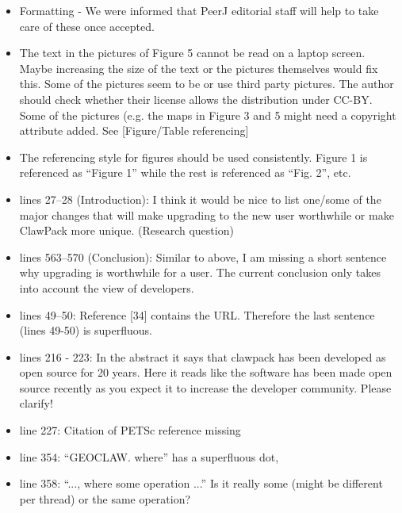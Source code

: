 \documentclass{letter}
\begin{document}
\begin{letter}
\begin{itemize}
    \item Formatting - We were informed that PeerJ editorial staff will help to
    take care of these once accepted.

    \item The text in the pictures of Figure 5 cannot be read on a laptop
    screen. Maybe increasing the size of the text or the pictures
    themselves would fix this. Some of the pictures seem to be or use
    third party pictures. The author should check whether their license
    allows the distribution under CC-BY. Some of the pictures (e.g. the
    maps in Figure 3 and 5 might need a copyright attribute added. See
    [Figure/Table referencing]

    \item The referencing style for figures should be used consistently. Figure
    1 is referenced as ``Figure 1'' while the rest is referenced as ``Fig. 2'',
    etc.

    \item lines 27--28 (Introduction): I think it would be nice to list one/some
    of the major changes that will make upgrading to the new user worthwhile or
    make ClawPack more unique. (Research question)

    \item lines 563--570 (Conclusion): Similar to above, I am missing a short
    sentence why upgrading is worthwhile for a user. The current conclusion only
    takes into account the view of developers.

    \item lines 49--50: Reference [34] contains the URL. Therefore the last
    sentence (lines 49-50) is superfluous.

    \item lines 216 - 223:  In the abstract it says that clawpack has been
    developed as open source for 20 years. Here it reads like the software has
    been made open source recently as you expect it to increase the developer
    community. Please clarify! 

    \item line 227: Citation of PETSc reference missing

    \item line 354: ``GEOCLAW. where'' has a superfluous dot,

    \item line 358:  ``..., where some operation ...'' Is it really some (might be
    different per thread) or the same operation?


\end{itemize}
\end{letter}
\end{document}
